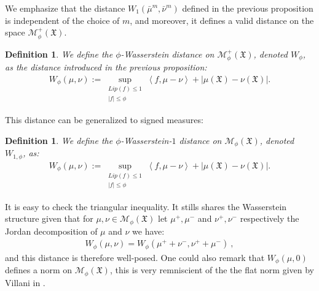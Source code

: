 \documentclass[11pt,a4paper]{article}
\newcommand{\MC}{\mathcal{M}}
\newcommand{\XF}{\mathfrak{X}}
\newcommand{\brac}[1]{\left\langle#1\right\rangle}
\newtheorem{definition}[theorem]{Definition}
\begin{document}
We emphasize that the distance $W_1(\bar{\mu}^m, \bar{\nu}^m)$ defined in the previous proposition is independent of the choice of $m$, and moreover, it defines a valid distance on the space $\MC^+_{\phi}(\XF)$.

\begin{definition}\label{def:Wasserstein-general}
We define the \emph{$\phi$-Wasserstein distance} on $\MC^+_{\phi}(\XF)$, denoted $W_{\phi}$, as the distance introduced in the previous proposition:
\begin{align*}
    W_{\phi}(\mu, \nu) := \sup_{\substack{Lip(f) \leq 1\\ |f| \leq \phi}} \brac{f, \mu - \nu} + \left| \mu(\XF) - \nu(\XF) \right|.
\end{align*}
\end{definition}
This distance can be generalized to signed measures:
\begin{definition}\label{def:Wasserstein-general-signed}
    We define the \emph{$\phi$-Wasserstein-$1$ distance} on $\MC_{\phi}(\XF)$, denoted $W_{1,\phi}$, as:
\begin{align*}
    W_{\phi}(\mu, \nu) := \sup_{\substack{Lip(f) \leq 1\\ |f| \leq \phi}} \brac{f, \mu - \nu} + \left| \mu(\XF) - \nu(\XF) \right|.
\end{align*}
\end{definition}
It is easy to check the triangular inequality. It stills shares the Wasserstein structure given that for $\mu,\nu \in \MC_{\phi}(\XF)$ let $\mu^+,\mu^-$ and $\nu^+,\nu^-$ respectively the Jordan decomposition of $\mu$ and $\nu$ we have:
\begin{align*}
    W_{\phi}(\mu, \nu) = W_{\phi}(\mu^+ + \nu^-, \nu^+ + \mu^-)\ ,
\end{align*}
and this distance is therefore well-posed. One could also remark that $W_{\phi}(\mu,0)$ defines a norm on $\MC_{\phi}(\XF)$, this is very remniscient of the the flat norm given by Villani in \cite{villani2008optimal}.
\end{document}
